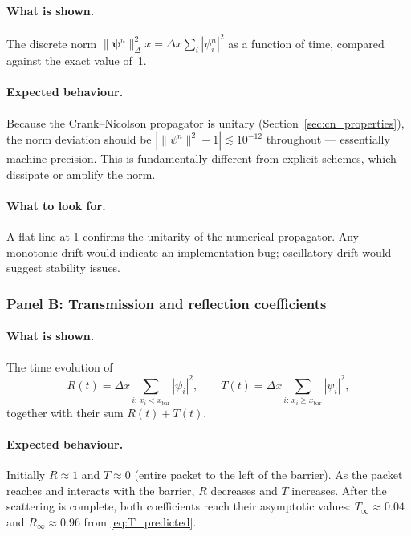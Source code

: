 \documentclass[12pt, a4paper]{article}
\newcommand{\dx}{\Delta x}
\newcommand{\CN}{Crank--Nicolson}
\begin{document}
\paragraph{What is shown.}
The discrete norm $\|\boldsymbol{\psi}^n\|^2_\dx = \dx\sum_i |\psi_i^n|^2$
as a function of time, compared against the exact value of~1.

\paragraph{Expected behaviour.}
Because the \CN{} propagator is unitary (Section~\ref{sec:cn_properties}),
the norm deviation should be $|\|\psi^n\|^2 - 1| \lesssim 10^{-12}$
throughout — essentially machine precision.  This is fundamentally
different from explicit schemes, which dissipate or amplify the norm.

\paragraph{What to look for.}
A flat line at 1 confirms the unitarity of the numerical propagator.
Any monotonic drift would indicate an implementation bug; oscillatory
drift would suggest stability issues.

\subsubsection{Panel B: Transmission and reflection coefficients}

\paragraph{What is shown.}
The time evolution of
\begin{equation}
  R(t) = \dx\sum_{i:\,x_i < x_\text{bar}} |\psi_i|^2,
  \qquad
  T(t) = \dx\sum_{i:\,x_i \geq x_\text{bar}} |\psi_i|^2,
\end{equation}
together with their sum $R(t) + T(t)$.

\paragraph{Expected behaviour.}
Initially $R \approx 1$ and $T \approx 0$ (entire packet to the left of
the barrier).  As the packet reaches and interacts with the barrier, $R$
decreases and $T$ increases.  After the scattering is complete, both
coefficients reach their asymptotic values: $T_\infty \approx 0.04$ and
$R_\infty \approx 0.96$ from \eqref{eq:T_predicted}.
\end{document}

